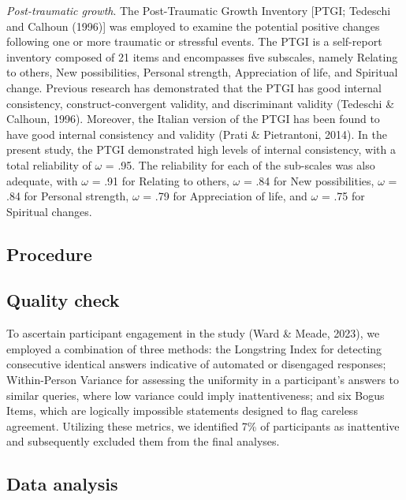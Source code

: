 \documentclass[
  man,floatsintext]{apa7}
\begin{document}
\emph{Post-traumatic growth}. The Post-Traumatic Growth Inventory {[}PTGI; Tedeschi and Calhoun (1996){]} was employed to examine the potential positive changes following one or more traumatic or stressful events. The PTGI is a self-report inventory composed of 21 items and encompasses five subscales, namely Relating to others, New possibilities, Personal strength, Appreciation of life, and Spiritual change. Previous research has demonstrated that the PTGI has good internal consistency, construct-convergent validity, and discriminant validity (Tedeschi \& Calhoun, 1996). Moreover, the Italian version of the PTGI has been found to have good internal consistency and validity (Prati \& Pietrantoni, 2014). In the present study, the PTGI demonstrated high levels of internal consistency, with a total reliability of \(\omega\) = .95. The reliability for each of the sub-scales was also adequate, with \(\omega\) = .91 for Relating to others, \(\omega\) = .84 for New possibilities, \(\omega\) = .84 for Personal strength, \(\omega\) = .79 for Appreciation of life, and \(\omega\) = .75 for Spiritual changes.

\hypertarget{procedure}{%
\subsection{Procedure}\label{procedure}}

\hypertarget{quality-check}{%
\subsection{Quality check}\label{quality-check}}

To ascertain participant engagement in the study (Ward \& Meade, 2023), we employed a combination of three methods: the Longstring Index for detecting consecutive identical answers indicative of automated or disengaged responses; Within-Person Variance for assessing the uniformity in a participant's answers to similar queries, where low variance could imply inattentiveness; and six Bogus Items, which are logically impossible statements designed to flag careless agreement. Utilizing these metrics, we identified 7\% of participants as inattentive and subsequently excluded them from the final analyses.

\hypertarget{data-analysis}{%
\subsection{Data analysis}\label{data-analysis}}
\end{document}
